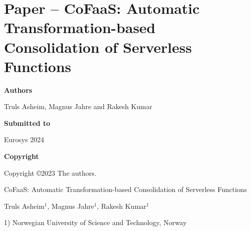 \documentclass[../../../main.tex]{subfiles}
\begin{document}
\chapter[Paper \liningfigures{B1} -- CoFaaS: Automatic Consolidation of Serverless Functions][Paper \liningfigures{B1} -- CoFaaS: Consolidation of Serverless Functions]{Paper  -- CoFaaS: Automatic Transformation-based Consolidation of Serverless Functions }

\label{chap:eurosys-paper}

\noindent \textbf{Authors}

\vspace*{0.3cm}

\noindent Truls Asheim, Magnus Jahre and Rakesh Kumar

\vspace*{0.7cm}

\noindent \textbf{Submitted to}

\vspace*{0.3cm}

\noindent Eurosys 2024

\vspace*{0.7cm}

\noindent \textbf{Copyright}

\vspace*{0.3cm}

\noindent Copyright ©2023 The authors.

\newpage

\vspace*{0.1cm}

\begin{center}

\Huge{CoFaaS: Automatic Transformation-based Consolidation of Serverless Functions}

\vspace{0.6cm}

\large{Truls Asheim$^{1}$, Magnus Jahre$^{1}$, Rakesh Kumar$^{1}$}

\vspace{0.1cm}

\small{1) Norwegian University of Science and Technology, Norway}


\end{center}
\end{document}
